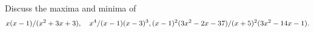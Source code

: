 Discuss the maxima and minima of
\[
x(x - 1)/(x^{2} + 3x + 3),\quad x^{4}/(x - 1)(x - 3)^{3},\\
(x - 1)^{2}(3x^{2} - 2x - 37)/(x + 5)^{2}(3x^{2} - 14x - 1).
\]


